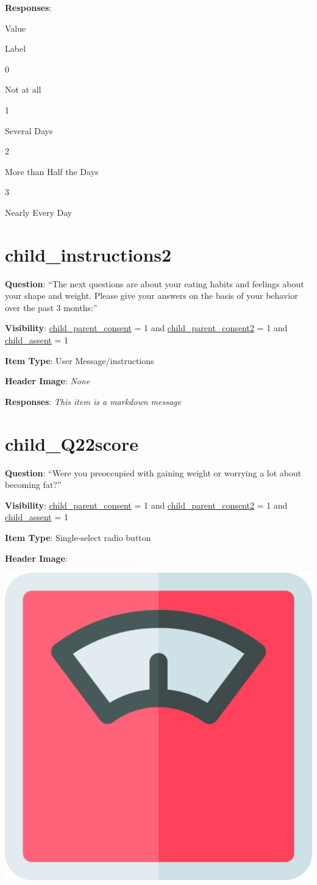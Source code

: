 \documentclass[]{book}
\begin{document}
\textbf{Responses}:

Value

Label

0

Not at all

1

Several Days

2

More than Half the Days

3

Nearly Every Day

\hypertarget{child_instructions2}{%
\section{child\_instructions2}\label{child_instructions2}}

\textbf{Question}: ``The next questions are about your eating habits and feelings about your shape and weight. Please give your answers on the basis of your behavior over the past 3 months:''

\textbf{Visibility}: \protect\hyperlink{child_parent_consent}{child\_parent\_consent} = 1 and \protect\hyperlink{child_parent_consent2}{child\_parent\_consent2} = 1 and \protect\hyperlink{child_assent}{child\_assent} = 1

\textbf{Item Type}: User Message/instructions

\textbf{Header Image}: \emph{None}

\textbf{Responses}: \emph{This item is a markdown message}

\hypertarget{child_q22score}{%
\section{child\_Q22score}\label{child_q22score}}

\textbf{Question}: ``Were you preoccupied with gaining weight or worrying a lot about becoming fat?''

\textbf{Visibility}: \protect\hyperlink{child_parent_consent}{child\_parent\_consent} = 1 and \protect\hyperlink{child_parent_consent2}{child\_parent\_consent2} = 1 and \protect\hyperlink{child_assent}{child\_assent} = 1

\textbf{Item Type}: Single-select radio button

\textbf{Header Image}:

\begin{flushleft}\includegraphics[width=0.33\linewidth]{downloadFigs4latex_HBN_PMHS_Codebook/child_Q22score_headerImg} \end{flushleft}
\end{document}
